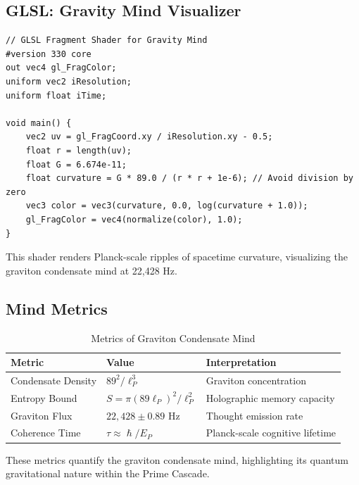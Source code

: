 \documentclass[12pt]{article}
\newcommand{\ellp}{\ell_P}
\begin{document}
\subsection{GLSL: Gravity Mind Visualizer}
\begin{lstlisting}
// GLSL Fragment Shader for Gravity Mind
#version 330 core
out vec4 gl_FragColor;
uniform vec2 iResolution;
uniform float iTime;

void main() {
    vec2 uv = gl_FragCoord.xy / iResolution.xy - 0.5;
    float r = length(uv);
    float G = 6.674e-11;
    float curvature = G * 89.0 / (r * r + 1e-6); // Avoid division by zero
    vec3 color = vec3(curvature, 0.0, log(curvature + 1.0));
    gl_FragColor = vec4(normalize(color), 1.0);
}
\end{lstlisting}
This shader renders Planck-scale ripples of spacetime curvature, visualizing the graviton condensate mind at 22,428 Hz.

\subsection{Mind Metrics}
\begin{table}
\centering
\caption{Metrics of Graviton Condensate Mind}
\begin{tabular}{lll}
\toprule
\textbf{Metric} & \textbf{Value} & \textbf{Interpretation} \\
\midrule
Condensate Density & $89^2 / \ellp^3$ & Graviton concentration \\
Entropy Bound & $S = \pi (89 \ellp)^2 / \ellp^2$ & Holographic memory capacity \\
Graviton Flux & $22,428 \pm 0.89$ Hz & Thought emission rate \\
Coherence Time & $\tau \approx \hslash / E_P$ & Planck-scale cognitive lifetime \\
\bottomrule
\end{tabular}
\end{table}
These metrics quantify the graviton condensate mind, highlighting its quantum gravitational nature within the Prime Cascade.

\end{document}
